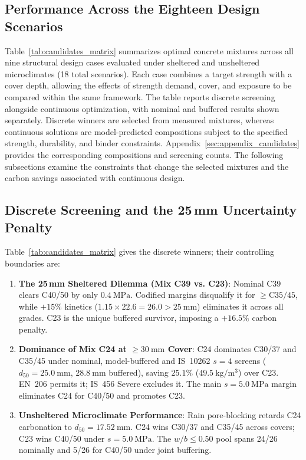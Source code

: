 \documentclass[journal]{IEEEtran}
\begin{document}
\subsection{Performance Across the Eighteen Design Scenarios}
Table~\ref{tab:candidates_matrix} summarizes optimal concrete mixtures across all nine structural design cases evaluated under sheltered and unsheltered microclimates (18 total scenarios). Each case combines a target strength with a cover depth, allowing the effects of strength demand, cover, and exposure to be compared within the same framework. The table reports discrete screening alongside continuous optimization, with nominal and buffered results shown separately. Discrete winners are selected from measured mixtures, whereas continuous solutions are model-predicted compositions subject to the specified strength, durability, and binder constraints. Appendix~\ref{sec:appendix_candidates} provides the corresponding compositions and screening counts. The following subsections examine the constraints that change the selected mixtures and the carbon savings associated with continuous design.

\subsection{\texorpdfstring{Discrete Screening and the 25\,mm Uncertainty Penalty}{Discrete Screening and the 25 mm Uncertainty Penalty}}
Table~\ref{tab:candidates_matrix} gives the discrete winners; their controlling boundaries are:
\begin{enumerate}\setlength{\itemsep}{0.5pt}\setlength{\parskip}{0pt}
    \item \textbf{The 25\,mm Sheltered Dilemma (Mix C39 vs. C23)}: Nominal C39 clears C40/50 by only $0.4\ \mathrm{MPa}$. Codified margins disqualify it for $\ge\mathrm{C35/45}$, while $+15\%$ kinetics ($1.15\times22.6=26.0>25\ \mathrm{mm}$) eliminates it across all grades. C23 is the unique buffered survivor, imposing a $+16.5\%$ carbon penalty.
    \item \textbf{Dominance of Mix C24 at $\ge 30\ \mathrm{mm}$ Cover}: C24 dominates C30/37 and C35/45 under nominal, model-buffered and IS~10262 $s=4$ screens ($d_{50}=25.0\ \mathrm{mm}$, $28.8\ \mathrm{mm}$ buffered), saving $25.1\%$ ($49.5\ \mathrm{kg/m^3}$) over C23. EN~206 permits it; IS~456 Severe excludes it. The main $s=5.0\ \mathrm{MPa}$ margin eliminates C24 for C40/50 and promotes C23.
    \item \textbf{Unsheltered Microclimate Performance}: Rain pore-blocking retards C24 carbonation to $d_{50}=17.52\ \mathrm{mm}$. C24 wins C30/37 and C35/45 across covers; C23 wins C40/50 under $s=5.0\ \mathrm{MPa}$. The $w/b\le0.50$ pool spans 24/26 nominally and 5/26 for C40/50 under joint buffering.
\end{enumerate}
\end{document}
